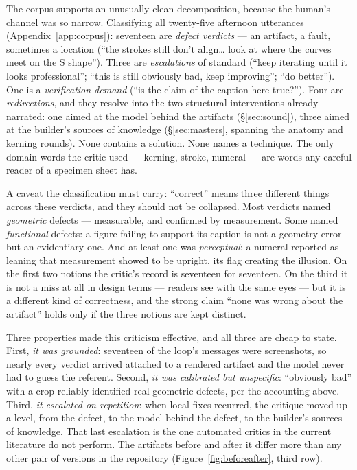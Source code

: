 \documentclass[12pt]{article}
\begin{document}
The corpus supports an unusually clean decomposition, because the human's channel was so narrow. Classifying all twenty-five afternoon utterances (Appendix~\ref{app:corpus}): seventeen are \emph{defect verdicts} — an artifact, a fault, sometimes a location (``the strokes still don't align\ldots{} look at where the curves meet on the S shape''). Three are \emph{escalations} of standard (``keep iterating until it looks professional''; ``this is still obviously bad, keep improving''; ``do better''). One is a \emph{verification demand} (``is the claim of the caption here true?''). Four are \emph{redirections}, and they resolve into the two structural interventions already narrated: one aimed at the model behind the artifacts (\S\ref{sec:sound}), three aimed at the builder's sources of knowledge (\S\ref{sec:masters}, spanning the anatomy and kerning rounds). None contains a solution. None names a technique. The only domain words the critic used — kerning, stroke, numeral — are words any careful reader of a specimen sheet has.

A caveat the classification must carry: ``correct'' means three different things across these verdicts, and they should not be collapsed. Most verdicts named \emph{geometric} defects — measurable, and confirmed by measurement. Some named \emph{functional} defects: a figure failing to support its caption is not a geometry error but an evidentiary one. And at least one was \emph{perceptual}: a numeral reported as leaning that measurement showed to be upright, its flag creating the illusion. On the first two notions the critic's record is seventeen for seventeen. On the third it is not a miss at all in design terms — readers see with the same eyes — but it is a different kind of correctness, and the strong claim ``none was wrong about the artifact'' holds only if the three notions are kept distinct.

Three properties made this criticism effective, and all three are cheap to state. First, \emph{it was grounded}: seventeen of the loop's messages were screenshots, so nearly every verdict arrived attached to a rendered artifact and the model never had to guess the referent. Second, \emph{it was calibrated but unspecific}: ``obviously bad'' with a crop reliably identified real geometric defects, per the accounting above. Third, \emph{it escalated on repetition}: when local fixes recurred, the critique moved up a level, from the defect, to the model behind the defect, to the builder's sources of knowledge. That last escalation is the one automated critics in the current literature do not perform. The artifacts before and after it differ more than any other pair of versions in the repository (Figure~\ref{fig:beforeafter}, third row).
\end{document}
